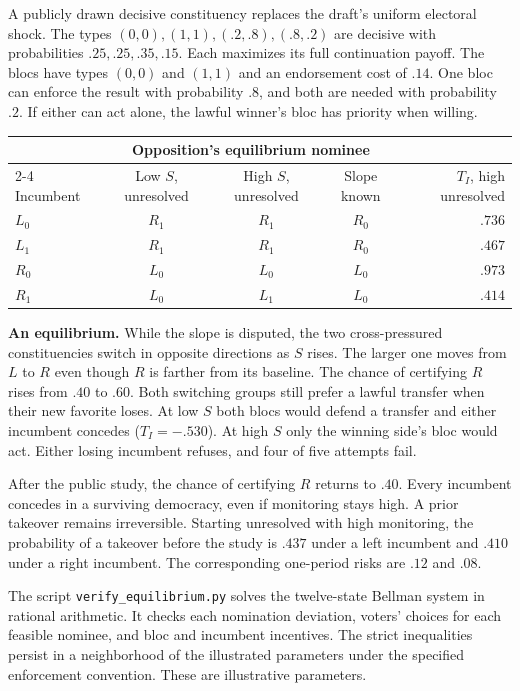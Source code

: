 \documentclass[11pt,letterpaper]{article}
\newcommand{\lead}[1]{\textbf{#1}\enspace}
\begin{document}
A publicly drawn decisive constituency replaces the draft's uniform electoral shock. The types $(0,0),(1,1),(.2,.8),(.8,.2)$ are decisive with probabilities $.25,.25,.35,.15$. Each maximizes its full continuation payoff. The blocs have types $(0,0)$ and $(1,1)$ and an endorsement cost of $.14$. One bloc can enforce the result with probability $.8$, and both are needed with probability $.2$. If either can act alone, the lawful winner's bloc has priority when willing.

\begin{center}
\small
\begin{tabular}{@{}lcccr@{}}
\toprule
&\multicolumn{3}{c}{Opposition's equilibrium nominee}&\\
\cmidrule(lr){2-4}
Incumbent & Low $S$, unresolved & High $S$, unresolved & Slope known & $T_I$, high unresolved\\
\midrule
$L_0$ & $R_1$ & $R_1$ & $R_0$ & $.736$\\
$L_1$ & $R_1$ & $R_1$ & $R_0$ & $.467$\\
$R_0$ & $L_0$ & $L_0$ & $L_0$ & $.973$\\
$R_1$ & $L_0$ & $L_1$ & $L_0$ & $.414$\\
\bottomrule
\end{tabular}
\end{center}

\lead{An equilibrium.} While the slope is disputed, the two cross-pressured constituencies switch in opposite directions as $S$ rises. The larger one moves from $L$ to $R$ even though $R$ is farther from its baseline. The chance of certifying $R$ rises from $.40$ to $.60$. Both switching groups still prefer a lawful transfer when their new favorite loses. At low $S$ both blocs would defend a transfer and either incumbent concedes ($T_I=-.530$). At high $S$ only the winning side's bloc would act. Either losing incumbent refuses, and four of five attempts fail.

After the public study, the chance of certifying $R$ returns to $.40$. Every incumbent concedes in a surviving democracy, even if monitoring stays high. A prior takeover remains irreversible. Starting unresolved with high monitoring, the probability of a takeover before the study is $.437$ under a left incumbent and $.410$ under a right incumbent. The corresponding one-period risks are $.12$ and $.08$.

The script \texttt{verify\_equilibrium.py} solves the twelve-state Bellman system in rational arithmetic. It checks each nomination deviation, voters' choices for each feasible nominee, and bloc and incumbent incentives. The strict inequalities persist in a neighborhood of the illustrated parameters under the specified enforcement convention. These are illustrative parameters.
\end{document}

